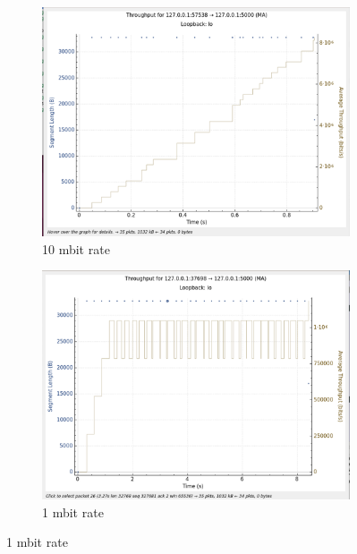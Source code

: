\documentclass{report}
\begin{document}
\begin{figure}[H]
    \centering
    \begin{subfigure}[b]{0.45\textwidth}
        \centering
        \includegraphics[width=\textwidth]{Pics/Cubic/r10mbit_s1m_th}
        \caption{10 mbit rate}
    \end{subfigure}
    \hfill
    \begin{subfigure}[b]{0.45\textwidth}
        \centering
        \includegraphics[width=\textwidth]{Pics/Cubic/r1mbit_s1m_th}
        \caption{1 mbit rate}
    \end{subfigure}
    \medskip


\end{figure}
\end{document}
